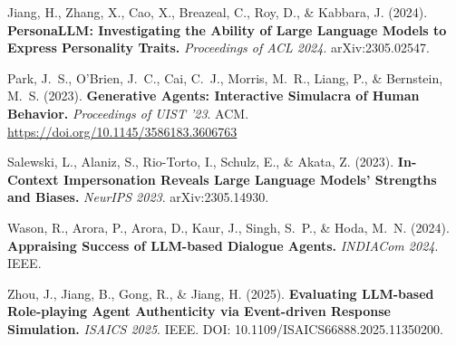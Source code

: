 \documentclass[12pt,a4paper]{article}
\begin{document}
\begin{description}[leftmargin=0em,itemsep=0.5em]
  \item Jiang, H., Zhang, X., Cao, X., Breazeal, C., Roy, D., \& Kabbara, J. (2024).
        \textbf{PersonaLLM: Investigating the Ability of Large Language Models to Express
        Personality Traits.} \textit{Proceedings of ACL 2024}. arXiv:2305.02547.
  \item Park, J.\ S., O'Brien, J.\ C., Cai, C.\ J., Morris, M.\ R., Liang, P., \&
        Bernstein, M.\ S. (2023). \textbf{Generative Agents: Interactive Simulacra of
        Human Behavior.} \textit{Proceedings of UIST '23}. ACM.
        \url{https://doi.org/10.1145/3586183.3606763}
  \item Salewski, L., Alaniz, S., Rio-Torto, I., Schulz, E., \& Akata, Z. (2023).
        \textbf{In-Context Impersonation Reveals Large Language Models' Strengths and
        Biases.} \textit{NeurIPS 2023}. arXiv:2305.14930.
  \item Wason, R., Arora, P., Arora, D., Kaur, J., Singh, S.\ P., \& Hoda, M.\ N. (2024).
        \textbf{Appraising Success of LLM-based Dialogue Agents.} \textit{INDIACom 2024}.
        IEEE.
  \item Zhou, J., Jiang, B., Gong, R., \& Jiang, H. (2025). \textbf{Evaluating
        LLM-based Role-playing Agent Authenticity via Event-driven Response Simulation.}
        \textit{ISAICS 2025}. IEEE. DOI: 10.1109/ISAICS66888.2025.11350200.
\end{description}
\end{document}
